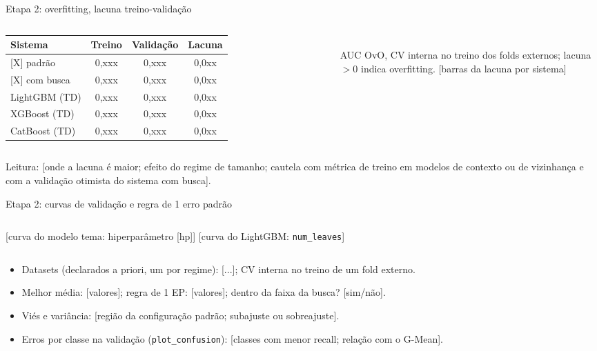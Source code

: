 \documentclass[aspectratio=169,11pt]{beamer}
\begin{document}
\begin{frame}{Etapa 2: overfitting, lacuna treino-validação}
    \begin{columns}[T,onlytextwidth]
        \footnotesize
        \begin{tabular}{l c c c}
            \toprule
            \textbf{Sistema} & \textbf{Treino} & \textbf{Validação} & \textbf{Lacuna} \\
            \midrule
            {}[X] padrão    & 0,xxx & 0,xxx & 0,0xx \\
            {}[X] com busca & 0,xxx & 0,xxx & 0,0xx \\
            LightGBM (TD)   & 0,xxx & 0,xxx & 0,0xx \\
            XGBoost (TD)    & 0,xxx & 0,xxx & 0,0xx \\
            CatBoost (TD)   & 0,xxx & 0,xxx & 0,0xx \\
            \bottomrule
        \end{tabular}
        \\[0.4em]
        AUC OvO, CV interna no treino dos folds externos; lacuna $> 0$ indica overfitting.
        \centering
        [barras da lacuna por sistema]
    \end{columns}
    \vspace{0.4em}
    \footnotesize Leitura: [onde a lacuna é maior; efeito do regime de tamanho; cautela com métrica de treino em modelos de contexto ou de vizinhança e com a validação otimista do sistema com busca].
\end{frame}

\begin{frame}{Etapa 2: curvas de validação e regra de 1 erro padrão}
    \begin{columns}[T,onlytextwidth]
        \centering
        [curva do modelo tema: hiperparâmetro [hp]]
        \centering
        [curva do LightGBM: \texttt{num\_leaves}]
    \end{columns}
    \vspace{0.6em}
    \begin{itemize}
        \footnotesize
        \item Datasets (declarados a priori, um por regime): [...]; CV interna no treino de um fold externo.
        \item Melhor média: [valores]; regra de 1 EP: [valores]; dentro da faixa da busca? [sim/não].
        \item Viés e variância: [região da configuração padrão; subajuste ou sobreajuste].
        \item Erros por classe na validação (\texttt{plot\_confusion}): [classes com menor recall; relação com o G-Mean].
    \end{itemize}
\end{frame}
\end{document}
